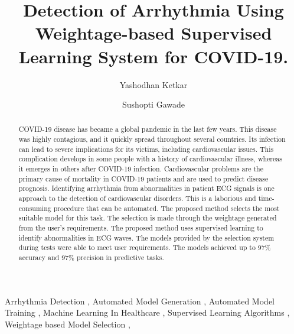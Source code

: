 \documentclass[a4paper,fleqn]{cas-dc}
\begin{document}
\let\WriteBookmarks\relax
\def\floatpagepagefraction{1}
\def\textpagefraction{.001}



\title [mode = title]{Detection of Arrhythmia Using Weightage-based Supervised Learning System for COVID-19.}

\let\printorcid\relax

\author[1]{Yashodhan Ketkar}



\author[2]{Sushopti Gawade}



\begin{abstract}
    COVID-19 disease has became a global pandemic in the last few years. This disease was highly contagious, and it quickly spread throughout several countries. Its infection can lead to severe implications for its victims, including cardiovascular issues. This complication develops in some people with a history of cardiovascular illness, whereas it emerges in others after COVID-19 infection. Cardiovascular problems are the primary cause of mortality in COVID-19 patients and are used to predict disease prognosis. Identifying arrhythmia from abnormalities in patient ECG signals is one approach to the detection of cardiovascular disorders. This is a laborious and time-consuming procedure that can be automated. The proposed method selects the most suitable model for this task. The selection is made through the weightage generated from the user's requirements. The proposed method uses supervised learning to identify abnormalities in ECG waves. The models provided by the selection system during tests were able to meet user requirements. The models achieved up to 97\% accuracy and 97\% precision in predictive tasks.
\end{abstract}

\begin{keywords}
    Arrhythmia Detection \sep
    Automated Model Generation \sep
    Automated Model Training \sep
    Machine Learning In Healthcare \sep
    Supervised Learning Algorithms \sep
    Weightage based Model Selection \sep
\end{keywords}
\end{document}
